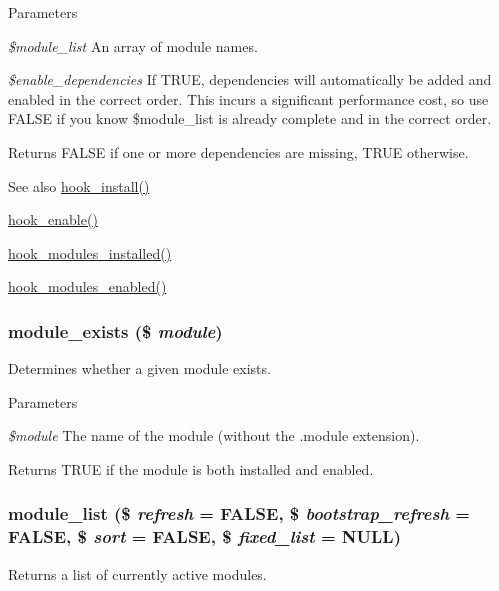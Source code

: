 \begin{DoxyParams}{Parameters}
\item[{\em \$module\_\-list}]An array of module names. \item[{\em \$enable\_\-dependencies}]If TRUE, dependencies will automatically be added and enabled in the correct order. This incurs a significant performance cost, so use FALSE if you know \$module\_\-list is already complete and in the correct order.\end{DoxyParams}
\begin{DoxyReturn}{Returns}
FALSE if one or more dependencies are missing, TRUE otherwise.
\end{DoxyReturn}
\begin{DoxySeeAlso}{See also}
\hyperlink{group__hooks_ga1ecdb5a2a046ea63dc790c3ed90338e5}{hook\_\-install()} 

\hyperlink{group__hooks_gaedcfb58c08d5c5f8ffcd1059ceeb39e4}{hook\_\-enable()} 

\hyperlink{group__hooks_ga71b7268520567cac1a2f296c205e5227}{hook\_\-modules\_\-installed()} 

\hyperlink{group__hooks_ga0eb7c67333e0f40b4a46c0dc4c4a92f3}{hook\_\-modules\_\-enabled()} 
\end{DoxySeeAlso}
\hypertarget{module_8inc_a83bfe4eac372da50ff3eaf949b1b6ff8}{
\subsubsection[{module\_\-exists}]{\setlength{\rightskip}{0pt plus 5cm}module\_\-exists (\$ {\em module})}}
\label{module_8inc_a83bfe4eac372da50ff3eaf949b1b6ff8}
Determines whether a given module exists.


\begin{DoxyParams}{Parameters}
\item[{\em \$module}]The name of the module (without the .module extension).\end{DoxyParams}
\begin{DoxyReturn}{Returns}
TRUE if the module is both installed and enabled. 
\end{DoxyReturn}
\hypertarget{module_8inc_ad4ef444bbb8e56724e12908cf9b6e1aa}{
\subsubsection[{module\_\-list}]{\setlength{\rightskip}{0pt plus 5cm}module\_\-list (\$ {\em refresh} = {\ttfamily FALSE}, \/  \$ {\em bootstrap\_\-refresh} = {\ttfamily FALSE}, \/  \$ {\em sort} = {\ttfamily FALSE}, \/  \$ {\em fixed\_\-list} = {\ttfamily NULL})}}
\label{module_8inc_ad4ef444bbb8e56724e12908cf9b6e1aa}
Returns a list of currently active modules.

